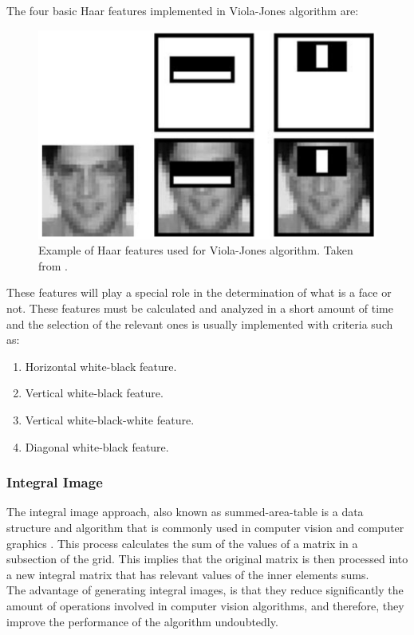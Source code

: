 \documentclass[11pt]{report} %
\begin{document}
The four basic Haar features implemented in Viola-Jones algorithm are:

\begin{figure}[H]
    \centering
    \includegraphics[width=0.6\linewidth]{assets/imgs/computer_vision/viola_jones_haar_features.png}
    \caption{Example of Haar features used for Viola-Jones algorithm. Taken from \citep{cite_haar_features_example_viola_jones}.} 
    \label{fig_viola_jones_features_example}
\end{figure}

These features will play a special role in the determination of what is a face or not. These features must be calculated and analyzed in a short amount of time and the selection of the relevant ones is usually implemented with criteria such as:

\begin{enumerate}
    \item Horizontal white-black feature.
    \item Vertical white-black feature.
    \item Vertical white-black-white feature.
    \item Diagonal white-black feature.
\end{enumerate}

\subsubsection{Integral Image}

The integral image approach, also known as summed-area-table is a data structure and algorithm that is commonly used in computer vision and computer graphics \citep{cite_matlab_integral_image}. This process calculates the sum of the values of a matrix in a subsection of the grid. This implies that the original matrix is then processed into a new integral matrix that has relevant values of the inner elements sums.\\

The advantage of generating integral images, is that they reduce significantly the amount of operations involved in computer vision algorithms, and therefore, they improve the performance of the algorithm undoubtedly.\\
\end{document}
